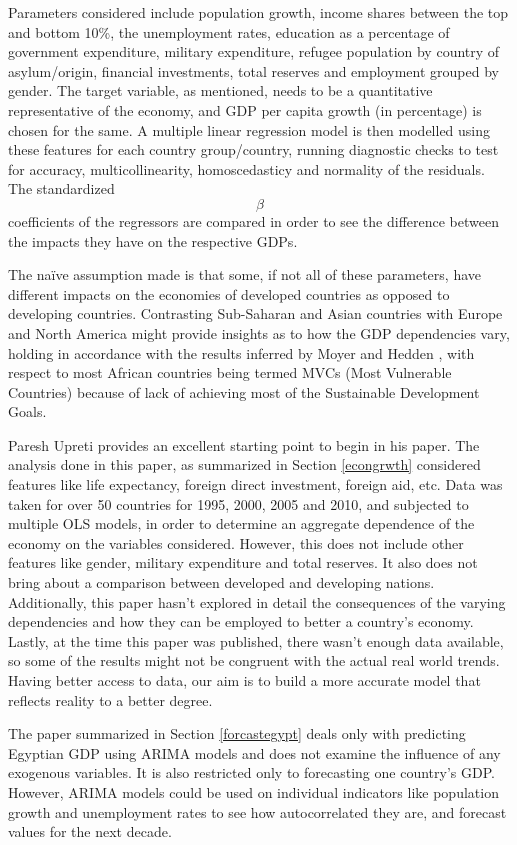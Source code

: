 \documentclass[conference]{IEEEtran}
\begin{document}
Parameters considered include population growth, income shares between the top and bottom 10\%, the unemployment rates, education as a percentage of government expenditure, military expenditure, refugee population by country of asylum/origin, financial investments, total reserves and employment grouped by gender. The target variable, as mentioned, needs to be a quantitative representative of the economy, and GDP per capita growth (in percentage) is chosen for the same. A multiple linear regression model is then modelled using these features for each country group/country, running diagnostic checks to test for accuracy, multicollinearity, homoscedasticy and normality of the residuals. The standardized \[\beta\] coefficients of the regressors are compared in order to see the difference between the impacts they have on the respective GDPs. 

The na\"{i}ve assumption made is that some, if not all of these parameters, have different impacts on the economies of developed countries as opposed to developing countries. Contrasting Sub-Saharan and Asian countries with Europe and North America might provide insights as to how the GDP dependencies vary, holding in accordance with the results inferred by Moyer and Hedden \cite{SDG}, with respect to most African countries being termed MVCs (Most Vulnerable Countries) because of lack of achieving most of the Sustainable Development Goals.

Paresh Upreti\cite{econgrowth} provides an excellent starting point to begin in his paper. The analysis done in this paper, as summarized in Section \ref{econgrwth} considered features like life expectancy, foreign direct investment, foreign aid, etc. Data was taken for over 50 countries for 1995, 2000, 2005 and 2010, and subjected to multiple OLS models, in order to determine an aggregate dependence of the economy on the variables considered. However, this does not include other features like gender, military expenditure and total reserves. It also does not bring about a comparison between developed and developing nations. Additionally, this paper hasn’t explored in detail the consequences of the varying dependencies and how they can be employed to better a country’s economy. Lastly, at the time this paper was published, there wasn’t enough data available, so some of the results might not be congruent with the actual real world trends. Having better access to data, our aim is to build a more accurate model that reflects reality to a better degree.

The paper\cite{forecastegypt} summarized in Section \ref{forcastegypt} deals only with predicting Egyptian GDP using ARIMA models and does not examine the influence of any exogenous variables. It is also restricted only to forecasting one country's GDP. However, ARIMA models could be used on individual indicators like population growth and unemployment rates to see how autocorrelated they are, and forecast values for the next decade. 
\end{document}
